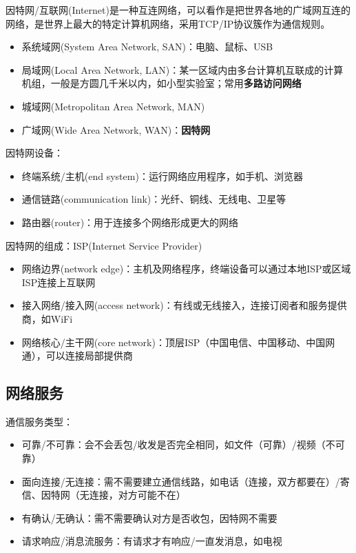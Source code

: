 因特网/互联网(Internet)是一种互连网络，可以看作是把世界各地的广域网互连的网络，是世界上最大的特定计算机网络，采用TCP/IP协议簇作为通信规则。
\begin{itemize}
	\item 系统域网(System Area Network, SAN)：电脑、鼠标、USB
	\item 局域网(Local Area Network, LAN)：某一区域内由多台计算机互联成的计算机组，一般是方圆几千米以内，如小型实验室；常用\textbf{多路访问网络}
	\item 城域网(Metropolitan Area Network, MAN)
	\item 广域网(Wide Area Network, WAN)：\textbf{因特网}
\end{itemize}

因特网设备：
\begin{itemize}
	\item 终端系统/主机(end system)：运行网络应用程序，如手机、浏览器
	\item 通信链路(communication link)：光纤、铜线、无线电、卫星等
	\item 路由器(router)：用于连接多个网络形成更大的网络
\end{itemize}

因特网的组成：ISP(Internet Service Provider)
\begin{itemize}
	\item 网络边界(network edge)：主机及网络程序，终端设备可以通过本地ISP或区域ISP连接上互联网
	\item 接入网络/接入网(access network)：有线或无线接入，连接订阅者和服务提供商，如WiFi
	\item 网络核心/主干网(core network)：顶层ISP（中国电信、中国移动、中国网通），可以连接局部提供商
\end{itemize}

\subsection{网络服务}
通信服务类型：
\begin{itemize}
	\item 可靠/不可靠：会不会丢包/收发是否完全相同，如文件（可靠）/视频（不可靠）
	\item 面向连接/无连接：需不需要建立通信线路，如电话（连接，双方都要在）/寄信、因特网（无连接，对方可能不在）
	\item 有确认/无确认：需不需要确认对方是否收包，因特网不需要
	\item 请求响应/消息流服务：有请求才有响应/一直发消息，如电视
\end{itemize}


